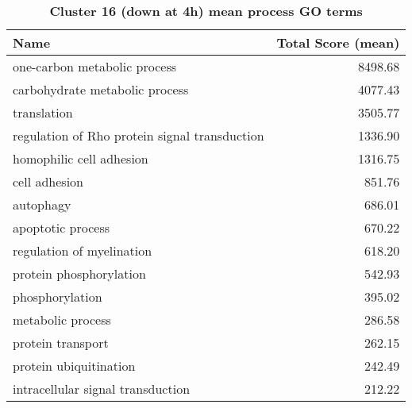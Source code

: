\begin{table}[hp]
\begin{center} \sf
\begin{tabular}{p{}r}
\toprule
\textbf{Name}                                 & \textbf{Total Score (mean)} \\ \midrule
one-carbon metabolic process                  & 8498.68                     \\
carbohydrate metabolic process                & 4077.43                     \\ %
translation                                   & 3505.77                     \\
regulation of Rho protein signal transduction & 1336.90                     \\
homophilic cell adhesion                      & 1316.75                     \\
cell adhesion                                 & 851.76                      \\
autophagy                                     & 686.01                      \\ %
apoptotic process                             & 670.22                      \\
regulation of myelination                     & 618.20                      \\
protein phosphorylation                       & 542.93                      \\
phosphorylation                               & 395.02                      \\
metabolic process                             & 286.58                      \\
protein transport                             & 262.15                      \\
protein ubiquitination                        & 242.49                      \\
intracellular signal transduction             & 212.22                      \\ \bottomrule
\end{tabular}
\end{center}

\caption[Cluster 16 (down at 4h) mean process GO terms]{\sf \textbf{Cluster 16 (down at 4h) mean process GO terms}}
\label{tab:cls16-process}
\end{table}